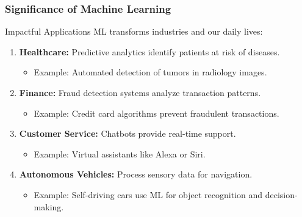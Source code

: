 \documentclass[aspectratio=169]{beamer}
\begin{document}
\begin{frame}[fragile]
    \frametitle{Significance of Machine Learning}
    
    \begin{block}{Impactful Applications}
    ML transforms industries and our daily lives:
    \end{block}

    \begin{enumerate}
        \item \textbf{Healthcare:} Predictive analytics identify patients at risk of diseases.
            \begin{itemize}
                \item Example: Automated detection of tumors in radiology images.
            \end{itemize}
        
        \item \textbf{Finance:} Fraud detection systems analyze transaction patterns.
            \begin{itemize}
                \item Example: Credit card algorithms prevent fraudulent transactions.
            \end{itemize}
        
        \item \textbf{Customer Service:} Chatbots provide real-time support.
            \begin{itemize}
                \item Example: Virtual assistants like Alexa or Siri.
            \end{itemize}

        \item \textbf{Autonomous Vehicles:} Process sensory data for navigation.
            \begin{itemize}
                \item Example: Self-driving cars use ML for object recognition and decision-making.
            \end{itemize}
    \end{enumerate}
\end{frame}
\end{document}
